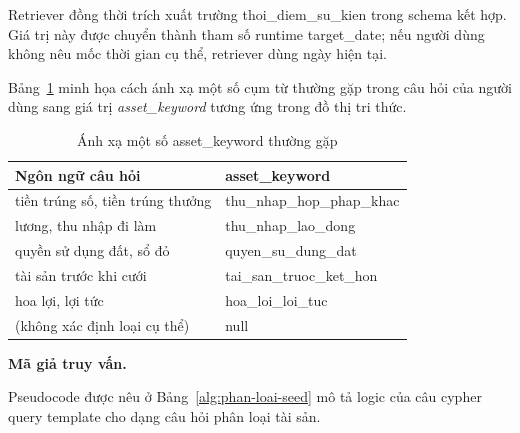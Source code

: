 \documentclass[../DoAn.tex]{subfiles}
\begin{document}
Retriever đồng thời trích xuất trường thoi\_diem\_su\_kien trong schema kết hợp. Giá trị này được chuyển thành tham số runtime target\_date; nếu người dùng không nêu mốc thời gian cụ thể, retriever dùng ngày hiện tại.

Bảng~\ref{tab:phan-loai-asset-map} minh họa cách ánh xạ một số cụm từ thường gặp trong câu hỏi của người dùng sang giá trị \textit{asset\_keyword} tương ứng trong đồ thị tri thức.

\begin{table}[htbp]
  \centering
\footnotesize
  \caption{Ánh xạ một số asset\_keyword thường gặp}
  \label{tab:phan-loai-asset-map}
  \begin{tabularx}{\textwidth}{|>{\raggedright\arraybackslash}X|>{\raggedright\arraybackslash}X|}
    \hline
    \textbf{Ngôn ngữ câu hỏi} & \textbf{asset\_keyword} \\ \hline
    tiền trúng số, tiền trúng thưởng & thu\_nhap\_hop\_phap\_khac \\ \hline
    lương, thu nhập đi làm & thu\_nhap\_lao\_dong \\ \hline
    quyền sử dụng đất, sổ đỏ & quyen\_su\_dung\_dat \\ \hline
    tài sản trước khi cưới & tai\_san\_truoc\_ket\_hon \\ \hline
    hoa lợi, lợi tức & hoa\_loi\_loi\_tuc \\ \hline
    (không xác định loại cụ thể) & null \\ \hline
  \end{tabularx}
\end{table}

\textbf{Mã giả truy vấn.}

Pseudocode được nêu ở Bảng~\ref{alg:phan-loai-seed} mô tả logic của câu cypher query template cho dạng câu hỏi phân loại tài sản.
\end{document}
